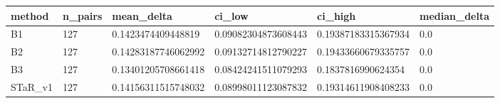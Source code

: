 \begin{tabular}{llllll}
 \hline
 method & n\_pairs & mean\_delta & ci\_low & ci\_high & median\_delta \\
 \hline
 B1 & 127 & 0.1423474409448819 & 0.09082304873608443 & 0.19387183315367934 & 0.0 \\
 B2 & 127 & 0.14283187746062992 & 0.09132714812790227 & 0.19433660679335757 & 0.0 \\
 B3 & 127 & 0.13401205708661418 & 0.08424241511079293 & 0.1837816990624354 & 0.0 \\
 STaR\_v1 & 127 & 0.14156311515748032 & 0.08998011123087832 & 0.19314611908408233 & 0.0 \\
 \hline
\end{tabular}
